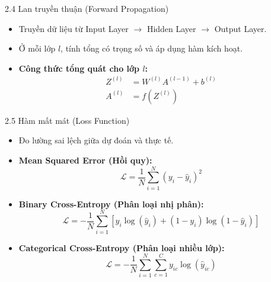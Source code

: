 \documentclass{beamer}
\begin{document}
\begin{frame}{2.4 Lan truyền thuận (Forward Propagation)}
  \begin{itemize}
    \item Truyền dữ liệu từ Input Layer $\rightarrow$ Hidden Layer $\rightarrow$ Output Layer.
    \item Ở mỗi lớp $l$, tính tổng có trọng số và áp dụng hàm kích hoạt.
    \item \textbf{Công thức tổng quát cho lớp $l$:}
    \begin{align*}
        Z^{(l)} &= W^{(l)} A^{(l-1)} + b^{(l)} \\
        A^{(l)} &= f\left(Z^{(l)}\right)
    \end{align*}
  \end{itemize}
\end{frame}

\begin{frame}{2.5 Hàm mất mát (Loss Function)}
  \begin{itemize}
    \item Đo lường sai lệch giữa dự đoán và thực tế.
    \item \textbf{Mean Squared Error (Hồi quy):}
    \begin{equation*}
        \mathcal{L} = \frac{1}{N} \sum_{i=1}^N (y_i - \hat{y}_i)^2
    \end{equation*}
    \item \textbf{Binary Cross-Entropy (Phân loại nhị phân):}
    \begin{equation*}
        \mathcal{L} = - \frac{1}{N} \sum_{i=1}^N \left[ y_i \log(\hat{y}_i) + (1 - y_i) \log(1 - \hat{y}_i) \right]
    \end{equation*}
    \item \textbf{Categorical Cross-Entropy (Phân loại nhiều lớp):}
    \begin{equation*}
        \mathcal{L} = - \frac{1}{N} \sum_{i=1}^N \sum_{c=1}^C y_{ic} \log(\hat{y}_{ic})
    \end{equation*}
  \end{itemize}
\end{frame}
\end{document}
